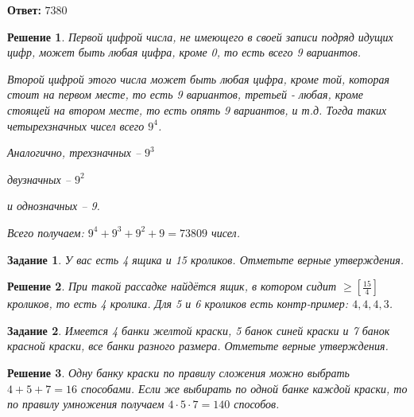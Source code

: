 \documentclass[a4paper,oneside]{memoir}
\newtheorem{task}{Задание}
\newtheorem{solution}{Решение}
\begin{document}
\textbf{Ответ:} $ 7380 $

\begin{solution}
Первой цифрой числа, не имеющего в своей записи подряд идущих цифр, может быть любая цифра, кроме 0, то есть всего 9 вариантов.

Второй цифрой этого числа может быть любая цифра, кроме той, которая стоит на первом месте, то есть 9 вариантов, третьей - любая, кроме стоящей на втором месте, то есть опять 9 вариантов, и т.д. Тогда таких четырехзначных чисел всего $ 9^4 $.

Аналогично, трехзначных -- $ 9^3 $

двузначных -- $ 9^2 $

и однозначных -- 9.

Всего получаем: $ 9^4 + 9^3 + 9^2 + 9 = 73809 $ чисел.
\end{solution}

\hrulefill

\begin{task}
	У вас есть 4 ящика и 15 кроликов. Отметьте верные утверждения.
\end{task}

\begin{solution}
При такой рассадке найдётся ящик, в котором сидит $ \geq [\frac{15}{4}] $ кроликов, то есть 4 кролика. Для 5 и 6 кроликов есть контр-пример: $ 4,4,4,3 $.
\end{solution}

\hrulefill

\begin{task}
	Имеется 4 банки желтой краски, 5 банок синей краски и 7 банок красной краски, все банки разного размера. Отметьте верные утверждения.
\end{task}

\begin{solution}
Одну банку краски по правилу сложения можно выбрать $ 4+5+7=16 $ способами. Если же выбирать по одной банке каждой краски, то по правилу умножения получаем  $4 \cdot 5 \cdot 7 = 140$ способов.
\end{solution}

\hrulefill
\end{document}
